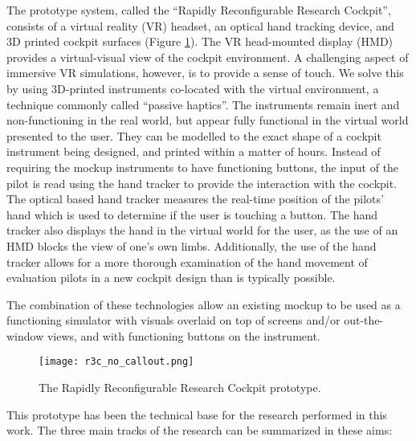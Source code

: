 The prototype system, called the ``Rapidly Reconfigurable Research Cockpit'', consists of a virtual reality (VR) headset, an optical hand tracking device, and 3D printed cockpit surfaces (Figure \ref{fig:intro_r3c}).
The VR head-mounted display (HMD) provides a virtual-visual view of the cockpit environment.
A challenging aspect of immersive VR simulations, however, is to provide a sense of touch.
We solve this by using 3D-printed instruments co-located with the virtual environment, a technique commonly called ``passive haptics''.
The instruments remain inert and non-functioning in the real world, but appear fully functional in the virtual world presented to the user.
They can be modelled to the exact shape of a cockpit instrument being designed, and printed within a matter of hours.
Instead of requiring the mockup instruments to have functioning buttons, the input of the pilot is read using the hand tracker to provide the interaction with the cockpit.
The optical based hand tracker measures the real-time position of the pilots' hand which is used to determine if the user is touching a button.
The hand tracker also displays the hand in the virtual world for the user, as the use of an HMD blocks the view of one's own limbs.
Additionally, the use of the hand tracker allows for a more thorough examination of the hand movement of evaluation pilots in a new cockpit design than is typically possible.

The combination of these technologies allow an existing mockup to be used as a functioning simulator with visuals overlaid on top of screens and/or out-the-window views, and with functioning buttons on the instrument.

\begin{figure}
    \centering
    \texttt{[image: r3c\_no\_callout.png]}
    \caption{The Rapidly Reconfigurable Research Cockpit prototype.}
    \label{fig:intro_r3c}
\end{figure}

This prototype has been the technical base for the research performed in this work.
The three main tracks of the research can be summarized in these aims:


